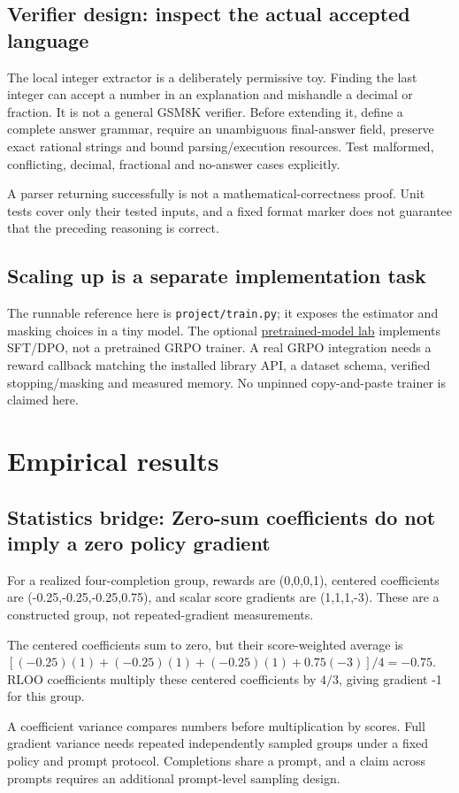 \documentclass[11pt,oneside]{scrbook}
\begin{document}
\section{Verifier design: inspect the actual accepted language}
The local integer extractor is a deliberately permissive toy. Finding the last
integer can accept a number in an explanation and mishandle a decimal or fraction.
It is not a general GSM8K verifier. Before extending it, define a complete
answer grammar, require an unambiguous final-answer field, preserve exact
rational strings and bound parsing/execution resources. Test malformed,
conflicting, decimal, fractional and no-answer cases explicitly.

A parser returning successfully is not a mathematical-correctness proof.
Unit tests cover only their tested inputs, and a fixed format marker does
not guarantee that the preceding reasoning is correct.

\section{Scaling up is a separate implementation task}
The runnable reference here is \texttt{project/train.py}; it exposes the
estimator and masking choices in a tiny model. The optional
\href{../llm-lab/README.md}{pretrained-model lab} implements SFT/DPO,
not a pretrained GRPO trainer. A real GRPO integration needs a reward callback
matching the installed library API, a dataset schema, verified stopping/masking
and measured memory. No unpinned copy-and-paste trainer is claimed here.

\chapter{Empirical results}

\section{Statistics bridge: Zero-sum coefficients do not imply a zero policy gradient}
\begin{example}
For a realized four-completion group, rewards are (0,0,0,1), centered coefficients are (-0.25,-0.25,-0.25,0.75), and scalar score gradients are (1,1,1,-3). These are a constructed group, not repeated-gradient measurements.

The centered coefficients sum to zero, but their score-weighted average is $[(-0.25)(1)+(-0.25)(1)+(-0.25)(1)+0.75(-3)]/4=-0.75$. RLOO coefficients multiply these centered coefficients by $4/3$, giving gradient -1 for this group.
\end{example}
A coefficient variance compares numbers before multiplication by scores. Full gradient variance needs repeated independently sampled groups under a fixed policy and prompt protocol. Completions share a prompt, and a claim across prompts requires an additional prompt-level sampling design.
\end{document}
